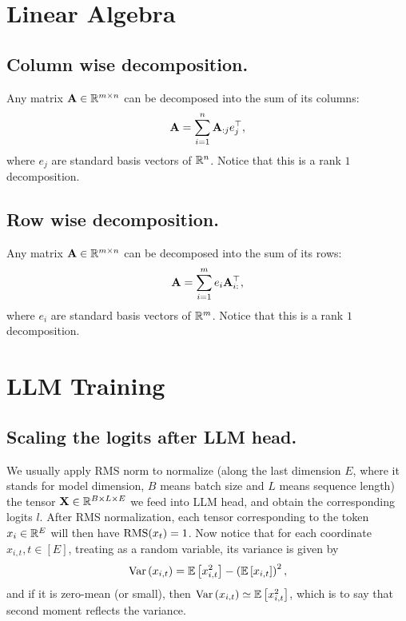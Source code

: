 \documentclass[11pt]{article}  %
\begin{document}
\section{Linear Algebra}


\subsection{Column wise decomposition.}
Any matrix $\mathbf{A} \in \mathbb{R}^{m \times n}$ can be decomposed into the sum of its columns: 
\begin{align}
	\mathbf{A} = \sum_{i=1}^{n} \mathbf{A}_{:j} e_j^{\top},
\end{align}
where $e_j$ are standard basis vectors of $\mathbb{R}^n$.
Notice that this is a rank $1$ decomposition.

\subsection{Row wise decomposition.}
Any matrix $\mathbf{A} \in \mathbb{R}^{m \times n}$ can be decomposed into the sum of its rows: 
\begin{align}
	\mathbf{A} = \sum_{i=1}^{m} e_i \mathbf{A}_{i:}^{\top},
\end{align}
where $e_i$ are standard basis vectors of $\mathbb{R}^m$.
Notice that this is a rank $1$ decomposition.


\section{LLM Training}
\subsection{Scaling the logits after LLM head.}
We usually apply RMS norm to normalize (along the last dimension $E$, where it stands for model dimension, $B$ means batch size and $L$ means sequence length) the tensor $\mathbf{X} \in \mathbb{R}^{B \times L \times E}$ we feed into LLM head, and obtain the corresponding logits $l$.
After RMS normalization, each tensor corresponding to the token $x_i \in \mathbb{R}^E$ will then have ${\rm RMS}(x_t) = 1$.
Now notice that for each coordinate $x_{i, t}, t\in[E]$, treating as a random variable, its variance is given by 
\begin{align}
  \operatorname{Var}\left( x_{i, t} \right) = \mathbb{E}\left[x^2_{i, t}\right] - \left( \mathbb{E}\left[x_{i, t}\right] \right)^2,
\end{align}
and if it is zero-mean (or small), then $\operatorname{Var}\left( x_{i, t} \right) \simeq \mathbb{E}\left[x^2_{i, t}\right]$, which is to say that second moment reflects the variance.
\end{document}
